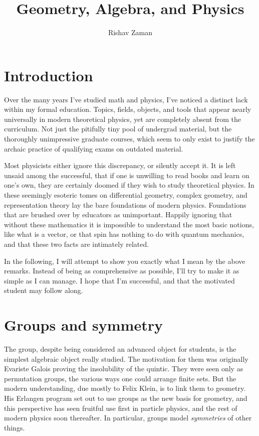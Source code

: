 \documentclass[12pt]{article}
\title{Geometry, Algebra, and Physics}
\author{Rishav Zaman}
\theoremstyle{definition}
\theoremstyle{remark}
\theoremstyle{example}
\begin{document}
\maketitle

\tableofcontents

\section{Introduction}

Over the many years I've studied math and physics, I've noticed a distinct lack within my formal education. Topics, fields, objects, and tools that appear nearly universally in modern theoretical physics, yet are completely absent from the curriculum. Not just the pitifully tiny pool of undergrad material, but the thoroughly unimpressive graduate courses, which seem to only exist to justify the archaic practice of qualifying exams on outdated material.

Most physicists either ignore this discrepancy, or silently accept it. It is left unsaid among the successful, that if one is unwilling to read books and learn on one's own, they are certainly doomed if they wish to study theoretical physics. In these seemingly esoteric tomes on differential geometry, complex geometry, and representation theory lay the bare foundations of modern physics. Foundations that are brushed over by educators as unimportant. Happily ignoring that without these mathematics it is impossible to understand the most basic notions, like what is a vector, or that spin has nothing to do with quantum mechanics, and that these two facts are intimately related.

In the following, I will attempt to show you exactly what I mean by the above remarks. Instead of being as comprehensive as possible, I'll try to make it as simple as I can manage. I hope that I'm successful, and that the motivated student may follow along.

\section{Groups and symmetry}

The group, despite being considered an advanced object for students, is the simplest algebraic object really studied. The motivation for them was originally Evariste Galois proving the insolubility of the quintic. They were seen only as permutation groups, the various ways one could arrange finite sets. But the modern understanding, due mostly to Felix Klein, is to link them to geometry. His Erlangen program set out to use groups as the new basis for geometry, and this perspective has seen fruitful use first in particle physics, and the rest of modern physics soon thereafter. In particular, groups model \textit{symmetries} of other things. 
\end{document}
